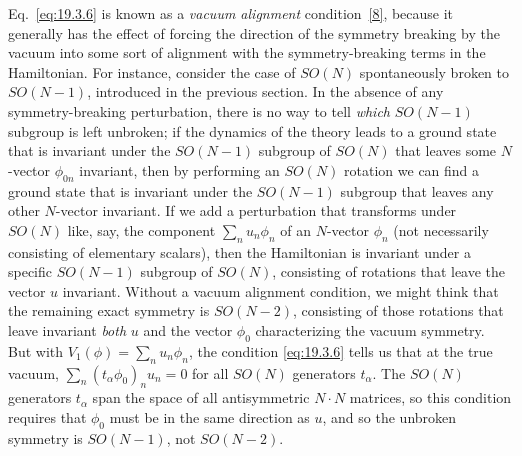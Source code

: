 Eq.~\eqref{eq:19.3.6} is known as a \emph{vacuum alignment} condition~\hyperref[ch19-ref-8]{[8]}, because it generally has the effect of forcing the direction of the symmetry breaking by the vacuum into some sort of alignment with the symmetry-breaking terms in the Hamiltonian. For instance, consider the case of $SO(N)$ spontaneously broken to $SO(N-1)$, introduced in the previous section. In the absence of any symmetry-breaking perturbation, there is no way to tell \emph{which} $SO(N-1)$ subgroup is left unbroken; if the dynamics of the theory leads to a ground state that is invariant under the $SO(N-1)$ subgroup of $SO(N)$ that leaves some $N$-vector $\phi_{0n}$ invariant, then by performing an $SO(N)$ rotation we can find a ground state that is invariant under the $SO(N-1)$ subgroup that leaves any other $N$-vector invariant. If we add a perturbation that transforms under $SO(N)$ like, say, the component $\sum_n u_n\phi_n$ of an $N$-vector $\phi_n$ (not necessarily consisting of elementary scalars), then the Hamiltonian is invariant under a specific $SO(N-1)$ subgroup of $SO(N)$, consisting of rotations that leave the vector $u$ invariant. Without a vacuum alignment condition, we might think that the remaining exact symmetry is $SO(N-2)$, consisting of those rotations that leave invariant \emph{both} $u$ and the vector $\phi_0$ characterizing the vacuum symmetry. But with $V_1(\phi)=\sum_n u_n\phi_n$, the condition \eqref{eq:19.3.6} tells us that at the true vacuum, $\sum_n(t_\alpha\phi_0)_n u_n=0$ for all $SO(N)$ generators $t_\alpha$. The $SO(N)$ generators $t_\alpha$ span the space of all antisymmetric $N\cdot N$ matrices, so this condition requires that $\phi_0$ must be in the same direction as $u$, and so the unbroken symmetry is $SO(N-1)$, not $SO(N-2)$.

